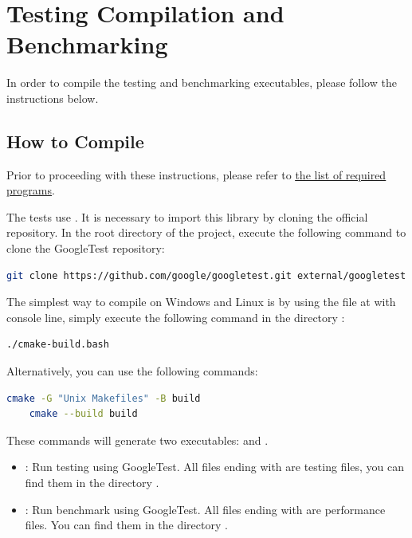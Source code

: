 
\section{Testing Compilation and Benchmarking}
\label{sec:testing_manual_howto_compile}

In order to compile the testing and benchmarking executables, please follow the instructions below.

\subsection{How to Compile} 

	

Prior to proceeding with these instructions, please refer to \underline{\hyperref[sec:required_programs]{the list of required programs}}.

\par\medskip
The tests use . It is necessary to import this library by cloning the official repository. In the root directory of the project, execute the following command to clone the GoogleTest repository:

\begin{lstlisting}[language=bash]
	git clone https://github.com/google/googletest.git external/googletest
\end{lstlisting}

\par\medskip
The simplest way to compile on Windows and Linux is by using the  file at  with  console line, simply execute the following command in the directory :

\begin{lstlisting}[language=bash]
	./cmake-build.bash
\end{lstlisting}

\par\medskip
Alternatively, you can use the following commands:

\begin{lstlisting}[language=bash]
	cmake -G "Unix Makefiles" -B build
	cmake --build build
\end{lstlisting}

\par\medskip
These commands will generate two executables:  and .

\begin{itemize}
	\item {}: Run testing using GoogleTest. All files ending with  are testing files, you can find them in the directory .
	\item {}: Run benchmark using GoogleTest. All files ending with  are performance files. You can find them in the directory .
\end{itemize}

